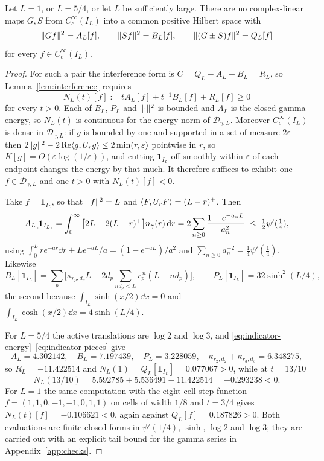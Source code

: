 \begin{theorem}
\label{thm:two-channel}
Let $L=1$, or $L=5/4$, or let $L$ be sufficiently large. There are no
complex-linear maps $G,S$ from $C_c^\infty(I_L)$ into a common positive
Hilbert space with
\begin{equation}\label{eq:two-channel-hypothesis}
 \lVert Gf\rVert^2=A_L[f],\qquad \lVert Sf\rVert^2=B_L[f],\qquad
 \lVert (G\pm S)f\rVert^2=Q_L[f]
\end{equation}
for every $f\in C_c^\infty(I_L)$.
\end{theorem}
\begin{proof}
For such a pair the interference form is $C=Q_L-A_L-B_L=R_L$, so
Lemma~\ref{lem:interference} requires
\begin{equation}\label{eq:two-channel-test}
 N_L(t)[f]:=tA_L[f]+t^{-1}B_L[f]+R_L[f]\geq0
\end{equation}
for every $t>0$. Each of $B_L$, $P_L$ and $\lVert \cdot\rVert^2$ is bounded and
$A_L$ is the closed gamma energy, so $N_L(t)$ is continuous for the energy
norm of $\mathcal D_{\gamma,L}$. Moreover $C_c^\infty(I_L)$ is dense in
$\mathcal D_{\gamma,L}$: if $g$ is bounded by one and supported in a set of
measure $2\varepsilon$ then
$2\lVert g\rVert^2-2\operatorname{Re}\langle g,U_rg\rangle\leq2\min(r,\varepsilon)$ pointwise in $r$, so
$K[g]=O(\varepsilon\log(1/\varepsilon))$, and cutting $\mathbf 1_{I_L}$ off
smoothly within $\varepsilon$ of each endpoint changes the energy by that
much. It therefore suffices to exhibit one $f\in\mathcal D_{\gamma,L}$ and
one $t>0$ with $N_L(t)[f]<0$.

Take $f=\mathbf 1_{I_L}$, so that $\lVert f\rVert^2=L$ and
$\langle F,U_rF\rangle=(L-r)^+$. Then
\begin{equation}\label{eq:indicator-energy}
 A_L[\mathbf 1_{I_L}]
 =\int_0^\infty\big[2L-2(L-r)^+\big]n_{\gamma}(r)\,\mathrm d r
 =2\sum_{n\geq0}\frac{1-e^{-a_nL}}{a_n^2}
 \;\leq\;\tfrac12\psi'(\tfrac14),
\end{equation}
using $\int_0^Lre^{-ar}\dd r+Le^{-aL}/a=(1-e^{-aL})/a^2$ and
$\sum_{n\geq0}a_n^{-2}=\tfrac14\psi'(\tfrac14)$. Likewise
\begin{equation}\label{eq:indicator-pieces}
 B_L[\mathbf 1_{I_L}]
 =\sum_{p}\Big[\kappa_{r_p,d_p}L-2d_p\!\!\sum_{nd_p<L}\!\!r_p^{\,n}(L-nd_p)\Big],
 \qquad
 P_L[\mathbf 1_{I_L}]=32\sinh^2(L/4),
\end{equation}
the second because $\int_{I_L}\sinh(x/2)\dd x=0$ and
$\int_{I_L}\cosh(x/2)\dd x=4\sinh(L/4)$.

For $L=5/4$ the active translations are $\log2$ and $\log3$, and
\eqref{eq:indicator-energy}--\eqref{eq:indicator-pieces} give
\[
 A_L=4.302142,\quad B_L=7.197439,\quad P_L=3.228059,\quad
 \kappa_{r_2,d_2}+\kappa_{r_3,d_3}=6.348275,
\]
so $R_L=-11.422514$ and $N_L(1)=Q_L[\mathbf 1_{I_L}]=0.077067>0$, while at
$t=13/10$
\[
 N_L(13/10)=5.592785+5.536491-11.422514=-0.293238<0 .
\]
For $L=1$ the same computation with the eight-cell step function
$f=(1,1,0,-1,-1,0,1,1)$ on cells of width $1/8$ and $t=3/4$ gives
$N_L(t)[f]=-0.106621<0$, again against $Q_L[f]=0.187826>0$. Both evaluations
are finite closed forms in $\psi'(1/4)$, $\sinh$, $\log2$ and $\log3$; they
are carried out with an explicit tail bound for the gamma series in
Appendix~\ref{app:checks}.


\end{proof}
